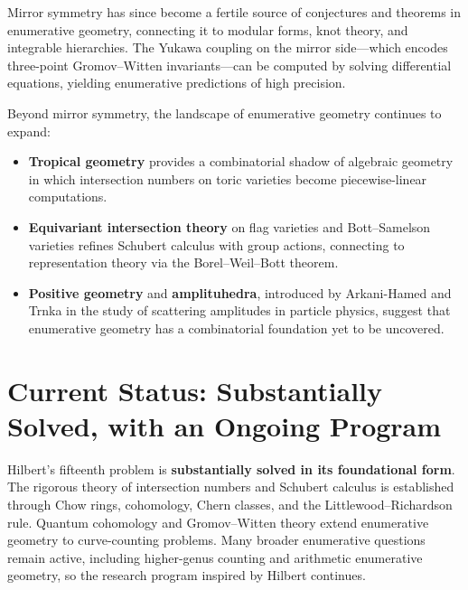 Mirror symmetry has since become a fertile source of conjectures and theorems in enumerative geometry, connecting it to modular forms, knot theory, and integrable hierarchies. The Yukawa coupling on the mirror side---which encodes three-point Gromov--Witten invariants---can be computed by solving differential equations, yielding enumerative predictions of high precision.

Beyond mirror symmetry, the landscape of enumerative geometry continues to expand:

\begin{itemize}
    \item \textbf{Tropical geometry} provides a combinatorial shadow of algebraic geometry in which intersection numbers on toric varieties become piecewise-linear computations.
    \item \textbf{Equivariant intersection theory} on flag varieties and Bott--Samelson varieties refines Schubert calculus with group actions, connecting to representation theory via the Borel--Weil--Bott theorem.
    \item \textbf{Positive geometry} and \textbf{amplituhedra}, introduced by Arkani-Hamed and Trnka in the study of scattering amplitudes in particle physics, suggest that enumerative geometry has a combinatorial foundation yet to be uncovered.
\end{itemize}

\section[Current Status]{Current Status: Substantially Solved, with an Ongoing Program}

\begin{partiallybox}
Hilbert's fifteenth problem is \textbf{substantially solved in its foundational form}. The rigorous theory of intersection numbers and Schubert calculus is established through Chow rings, cohomology, Chern classes, and the Littlewood--Richardson rule. Quantum cohomology and Gromov--Witten theory extend enumerative geometry to curve-counting problems. Many broader enumerative questions remain active, including higher-genus counting and arithmetic enumerative geometry, so the research program inspired by Hilbert continues.
\end{partiallybox}

